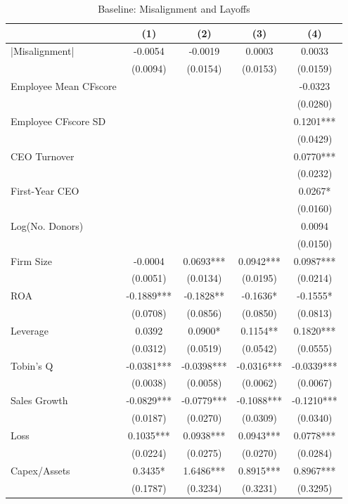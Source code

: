 \documentclass[
  10pt,
]{article}
\begin{document}
\begin{table}[!h]
\centering
\caption{\label{tab:table3}Baseline: Misalignment and Layoffs}
\centering
\fontsize{8}{10}\selectfont
\begin{threeparttable}
\begin{tabular}[t]{lcccc}
\toprule
 & (1) & (2) & (3) & (4)\\
\midrule
|Misalignment| & -0.0054 & -0.0019 & 0.0003 & 0.0033\\
 & (0.0094) & (0.0154) & (0.0153) & (0.0159)\\
Employee Mean CFscore &  &  &  & -0.0323\\
 &  &  &  & (0.0280)\\
Employee CFscore SD &  &  &  & 0.1201***\\
\addlinespace
 &  &  &  & (0.0429)\\
CEO Turnover &  &  &  & 0.0770***\\
 &  &  &  & (0.0232)\\
First-Year CEO &  &  &  & 0.0267*\\
 &  &  &  & (0.0160)\\
\addlinespace
Log(No. Donors) &  &  &  & 0.0094\\
 &  &  &  & (0.0150)\\
Firm Size & -0.0004 & 0.0693*** & 0.0942*** & 0.0987***\\
 & (0.0051) & (0.0134) & (0.0195) & (0.0214)\\
ROA & -0.1889*** & -0.1828** & -0.1636* & -0.1555*\\
\addlinespace
 & (0.0708) & (0.0856) & (0.0850) & (0.0813)\\
Leverage & 0.0392 & 0.0900* & 0.1154** & 0.1820***\\
 & (0.0312) & (0.0519) & (0.0542) & (0.0555)\\
Tobin's Q & -0.0381*** & -0.0398*** & -0.0316*** & -0.0339***\\
 & (0.0038) & (0.0058) & (0.0062) & (0.0067)\\
\addlinespace
Sales Growth & -0.0829*** & -0.0779*** & -0.1088*** & -0.1210***\\
 & (0.0187) & (0.0270) & (0.0309) & (0.0340)\\
Loss & 0.1035*** & 0.0938*** & 0.0943*** & 0.0778***\\
 & (0.0224) & (0.0275) & (0.0270) & (0.0284)\\
Capex/Assets & 0.3435* & 1.6486*** & 0.8915*** & 0.8967***\\
\addlinespace
 & (0.1787) & (0.3234) & (0.3231) & (0.3295)\\

\end{tabular}
\end{threeparttable}
\end{table}
\end{document}
